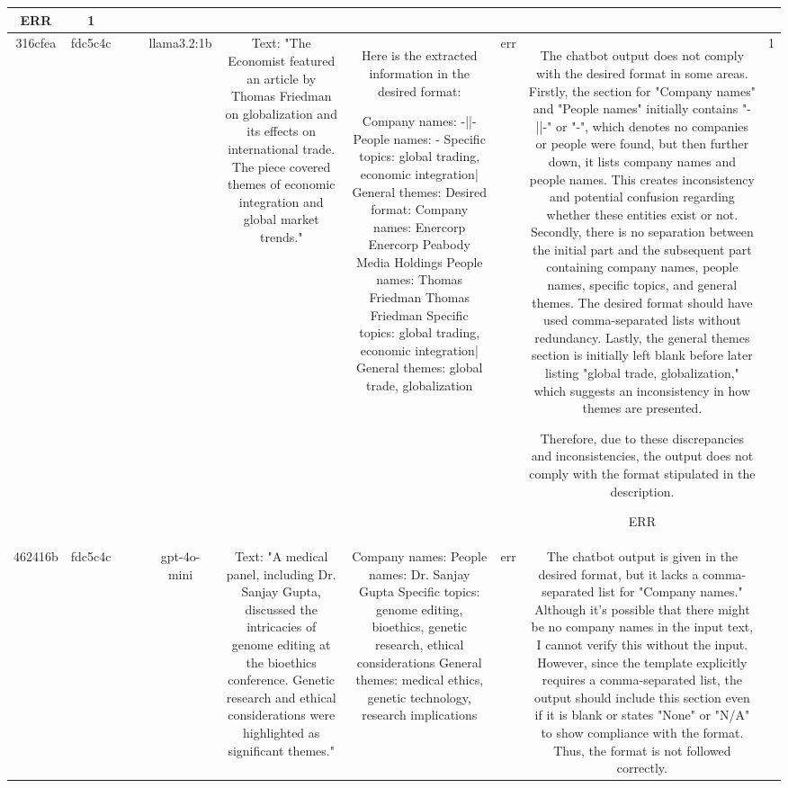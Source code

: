 \begin{table}[h!]
\begin{tabular}{|c|c|c|c|c|c|c|c|c|c|}
ERR & 1\\
\hline
316cfea & fdc5c4c &  &  & llama3.2:1b & Text: "The Economist featured an article by Thomas Friedman on globalization and its effects on international trade. The piece covered themes of economic integration and global market trends." & Here is the extracted information in the desired format:

Company names: -||-
People names: -
Specific topics: global trading, economic integration|
General themes: 
Desired format:
Company names: Enercorp
Enercorp
Peabody Media Holdings
People names: Thomas Friedman
Thomas Friedman
Specific topics: global trading, economic integration|
General themes: global trade, globalization & err & The chatbot output does not comply with the desired format in some areas. Firstly, the section for "Company names" and "People names" initially contains "-||-" or "-", which denotes no companies or people were found, but then further down, it lists company names and people names. This creates inconsistency and potential confusion regarding whether these entities exist or not. Secondly, there is no separation between the initial part and the subsequent part containing company names, people names, specific topics, and general themes. The desired format should have used comma-separated lists without redundancy. Lastly, the general themes section is initially left blank before later listing "global trade, globalization," which suggests an inconsistency in how themes are presented.

Therefore, due to these discrepancies and inconsistencies, the output does not comply with the format stipulated in the description. 

ERR & 1\\
\hline
462416b & fdc5c4c &  &  & gpt-4o-mini & Text: "A medical panel, including Dr. Sanjay Gupta, discussed the intricacies of genome editing at the bioethics conference. Genetic research and ethical considerations were highlighted as significant themes." & Company names: 
People names: Dr. Sanjay Gupta
Specific topics: genome editing, bioethics, genetic research, ethical considerations
General themes: medical ethics, genetic technology, research implications & err & The chatbot output is given in the desired format, but it lacks a comma-separated list for "Company names." Although it's possible that there might be no company names in the input text, I cannot verify this without the input. However, since the template explicitly requires a comma-separated list, the output should include this section even if it is blank or states "None" or "N/A" to show compliance with the format. Thus, the format is not followed correctly.


\end{tabular}
\end{table}
